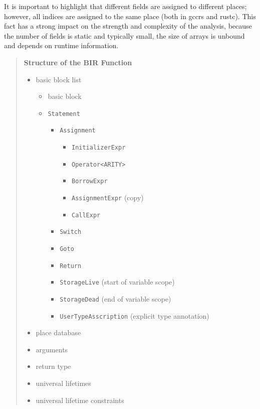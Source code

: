 \documentclass[
  11pt,
  twoside,symmetric]{report}
\providecommand{\tightlist}{%
  \setlength{\itemsep}{0pt}\setlength{\parskip}{0pt}}
\begin{document}
It is important to highlight that different fields are assigned to
different places; however, all indices are assigned to the same place
(both in gccrs and rustc). This fact has a strong impact on the strength
and complexity of the analysis, because the number of fields is static
and typically small, the size of arrays is unbound and depends on
runtime information.

\begin{quote}
\textbf{Structure of the BIR Function}

\begin{itemize}
\tightlist
\item
  basic block list

  \begin{itemize}
  \tightlist
  \item
    basic block
  \item
    \texttt{Statement}

    \begin{itemize}
    \tightlist
    \item
      \texttt{Assignment}

      \begin{itemize}
      \tightlist
      \item
        \texttt{InitializerExpr}
      \item
        \texttt{Operator\textless{}ARITY\textgreater{}}
      \item
        \texttt{BorrowExpr}
      \item
        \texttt{AssignmentExpr} (copy)
      \item
        \texttt{CallExpr}
      \end{itemize}
    \item
      \texttt{Switch}
    \item
      \texttt{Goto}
    \item
      \texttt{Return}
    \item
      \texttt{StorageLive} (start of variable scope)
    \item
      \texttt{StorageDead} (end of variable scope)
    \item
      \texttt{UserTypeAsscription} (explicit type annotation)
    \end{itemize}
  \end{itemize}
\item
  place database
\item
  arguments
\item
  return type
\item
  universal lifetimes
\item
  universal lifetime constraints
\end{itemize}
\end{quote}
\end{document}
